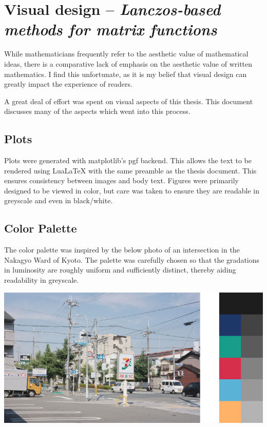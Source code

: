 \documentclass[]{report}
\theoremstyle{definition}
\begin{document}
\fontsize{11}{16}\selectfont

\clearpage
\section*{Visual design \hfill -- \hfill \textit{Lanczos-based methods for matrix functions}}


While mathematicians frequently refer to the aesthetic value of mathematical ideas, there is a comparative lack of emphasis on the aesthetic value of written mathematics.
I find this unfortunate, as it is my belief that visual design can greatly impact the experience of readers.

A great deal of effort was spent on visual aspects of this thesis.
This document discusses many of the aspects which went into this process. 


\subsection*{Plots}

Plots were generated with matplotlib's pgf backend. 
This allows the text to be rendered using LuaLaTeX with the same preamble as the thesis document.
This ensures consistency between images and body text.
Figures were primarily designed to be viewed in color, but care was taken to ensure they are readable in greyscale and even in black/white.


\subsection*{Color Palette}
The color palette was inspired by the below photo of an intersection in the Nakagyo Ward of Kyoto.
The palette was carefully chosen so that the gradations in luminosity are roughly uniform and sufficiently distinct, thereby aiding readability in greyscale.


\vfill
\includegraphics{palette/palette.pdf}
\end{document}

